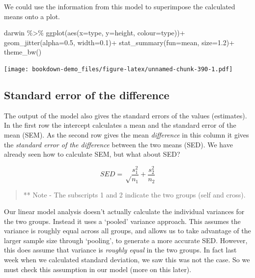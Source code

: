 \documentclass[
]{book}
\newenvironment{Shaded}{\begin{snugshade}}{\end{snugshade}}
\newcommand{\AttributeTok}[1]{\textcolor[rgb]{0.77,0.63,0.00}{#1}}
\newcommand{\FloatTok}[1]{\textcolor[rgb]{0.00,0.00,0.81}{#1}}
\newcommand{\FunctionTok}[1]{\textcolor[rgb]{0.00,0.00,0.00}{#1}}
\newcommand{\NormalTok}[1]{#1}
\newcommand{\SpecialCharTok}[1]{\textcolor[rgb]{0.00,0.00,0.00}{#1}}
\begin{document}
We could use the information from this model to superimpose the calculated means onto a plot.

\begin{Shaded}
\begin{Highlighting}[]
\NormalTok{darwin }\SpecialCharTok{\%\textgreater{}\%} 
  \FunctionTok{ggplot}\NormalTok{(}\FunctionTok{aes}\NormalTok{(}\AttributeTok{x=}\NormalTok{type, }
             \AttributeTok{y=}\NormalTok{height,}
             \AttributeTok{colour=}\NormalTok{type))}\SpecialCharTok{+}
  \FunctionTok{geom\_jitter}\NormalTok{(}\AttributeTok{alpha=}\FloatTok{0.5}\NormalTok{,}
              \AttributeTok{width=}\FloatTok{0.1}\NormalTok{)}\SpecialCharTok{+}
  \FunctionTok{stat\_summary}\NormalTok{(}\AttributeTok{fun=}\NormalTok{mean,}
               \AttributeTok{size=}\FloatTok{1.2}\NormalTok{)}\SpecialCharTok{+}
  \FunctionTok{theme\_bw}\NormalTok{()}
\end{Highlighting}
\end{Shaded}

\texttt{[image: bookdown-demo\_files/figure-latex/unnamed-chunk-390-1.pdf]}

\hypertarget{standard-error-of-the-difference-1}{%
\subsection{Standard error of the difference}\label{standard-error-of-the-difference-1}}

The output of the model also gives the standard errors of the values (estimates). In the first row the intercept calculates a mean and the standard error of the mean (SEM). As the second row gives the mean \emph{difference} in this column it gives the \emph{standard error of the difference} between the two means (SED). We have already seen how to calculate SEM, but what about SED?

\[
SED = {\sqrt \frac{s_1^2}{n_1}}+\frac{s_2^2}{n_2}
\]

\begin{quote}
** Note - The subscripts 1 and 2 indicate the two groups (self and cross).
\end{quote}

Our linear model analysis doesn't actually calculate the individual variances for the two groups. Instead it uses a `pooled' variance approach. This assumes the variance is roughly equal across all groups, and allows us to take advantage of the larger sample size through `pooling', to generate a more accurate SED. However, this does assume that variance is \emph{roughly equal} in the two groups. In fact last week when we calculated standard deviation, we saw this was not the case. So we must check this assumption in our model (more on this later).
\end{document}
